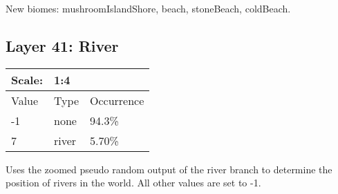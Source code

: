 \documentclass{article}
\begin{document}
	\medskip\noindent
	New biomes: mushroomIslandShore, beach, stoneBeach, coldBeach.

	\subsection{Layer 41: River}
	\begin{tabular}{|l|l|l|}\hline
		Scale: & \multicolumn{2}{|l|}{1:4} \\\hline\hline
		Value  & Type             & Occurrence \\\hline
		-1     & none             & 94.3\%\\\hline
		7      & river            & 5.70\%\\\hline
	\end{tabular}
	
	\medskip\noindent
	Uses the zoomed pseudo random output of the river branch to determine the position of rivers in the world. All other values are set to -1.
\end{document}
